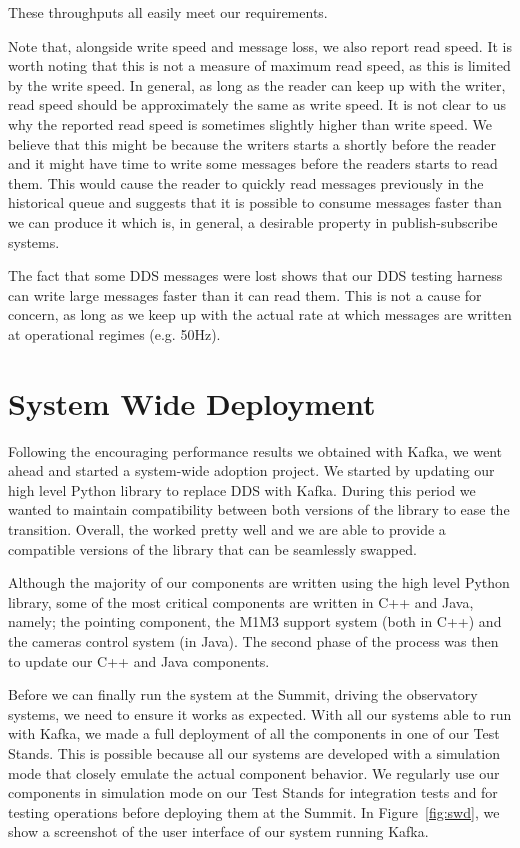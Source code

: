 \documentclass[]{spie}  %
\begin{document}
These throughputs all easily meet our requirements.

Note that, alongside write speed and message loss, we also report read speed.
It is worth noting that this is not a measure of maximum read speed, as this is limited by the write speed.
In general, as long as the reader can keep up with the writer, read speed should be approximately the same as write speed.
It is not clear to us why the reported read speed is sometimes slightly higher than write speed.
We believe that this might be because the writers starts a shortly before the reader and it might have time to write some messages before the readers starts to read them.
This would cause the reader to quickly read messages previously in the historical queue and suggests that it is possible to consume messages faster than we can produce it which is, in general, a desirable property in publish-subscribe systems.

The fact that some DDS messages were lost shows that our DDS testing harness can write large messages faster than it can read them.
This is not a cause for concern, as long as we keep up with the actual rate at which messages are written at operational regimes (e.g. 50Hz).

\section{System Wide Deployment}
\label{sec:swd}

Following the encouraging performance results we obtained with Kafka, we went ahead and started a system-wide adoption project.
We started by updating our high level Python library to replace DDS with Kafka.
During this period we wanted to maintain compatibility between both versions of the library to ease the transition.
Overall, the worked pretty well and we are able to provide a compatible versions of the library that can be seamlessly swapped.

Although the majority of our components are written using the high level Python library, some of the most critical components are written in C++ and Java, namely; the pointing component, the M1M3 support system (both in C++) and the cameras control system (in Java).
The second phase of the process was then to update our C++ and Java components.

Before we can finally run the system at the Summit, driving the observatory systems, we need to ensure it works as expected.
With all our systems able to run with Kafka, we made a full deployment of all the components in one of our Test Stands.
This is possible because all our systems are developed with a simulation mode that closely emulate the actual component behavior.
We regularly use our components in simulation mode on our Test Stands for integration tests and for testing operations before deploying them at the Summit.
In Figure~\ref{fig:swd}, we show a screenshot of the user interface of our system running Kafka.
\end{document}
